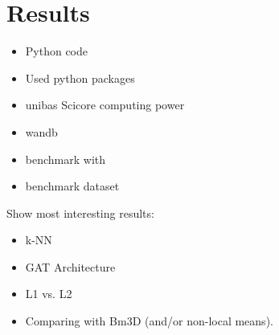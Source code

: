 \chapter{Results}
\label{sec:results}

\begin{itemize}
  \item Python code
  \item Used python packages
  \item unibas Scicore computing power
  \item wandb\cite{wandb}
  \item benchmark with \cite{bm3d}
  \item benchmark dataset \cite{lodopab-dataset}
\end{itemize}


Show most interesting results:
\begin{itemize}
  \item k-NN
  \item GAT Architecture
  \item L1 vs. L2
  \item Comparing with Bm3D (and/or non-local means).
\end{itemize}
